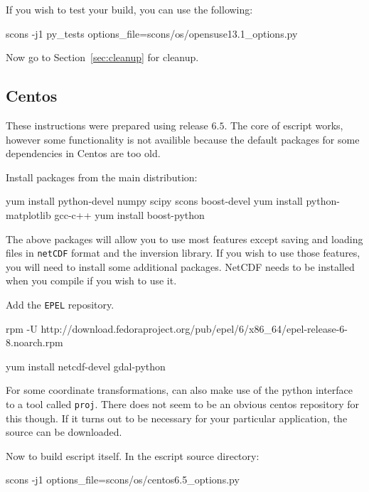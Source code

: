 \noindent If you wish to test your build, you can use the following:
\begin{shellCode}
scons -j1 py_tests options_file=scons/os/opensuse13.1_options.py 
\end{shellCode}

\noindent Now go to Section~\ref{sec:cleanup} for cleanup.

\subsection{Centos}\label{sec:centossrc}
These instructions were prepared using release $6.5$.
The core of escript works, however some functionality is not availible because the default packages for some dependencies in Centos are too old.

\noindent Install packages from the main distribution:
\begin{shellCode}
yum install python-devel numpy scipy scons boost-devel
yum install python-matplotlib gcc-c++
yum install boost-python 
\end{shellCode}

The above packages will allow you to use most features except saving and loading files in \texttt{netCDF} 
format and the \downunder inversion library.
If you wish to use those features, you will need to install some additional packages.
NetCDF needs to be installed when you compile if you wish to use it.
\begin{optionalstep}
\noindent Add the \texttt{EPEL} repository.
\begin{shellCode}
rpm -U http://download.fedoraproject.org/pub/epel/6/x86_64/epel-release-6-8.noarch.rpm
\end{shellCode}

\begin{shellCode}
yum install netcdf-devel gdal-python
\end{shellCode}
\end{optionalstep}

\noindent For some coordinate transformations, \downunder can also make use of the python interface to a tool called \texttt{proj}.
There does not seem to be an obvious centos repository for this though.
If it turns out to be necessary for your particular application, the source can be downloaded. 

\noindent Now to build escript itself.
In the escript source directory:
\begin{shellCode}
scons -j1 options_file=scons/os/centos6.5_options.py
\end{shellCode}

